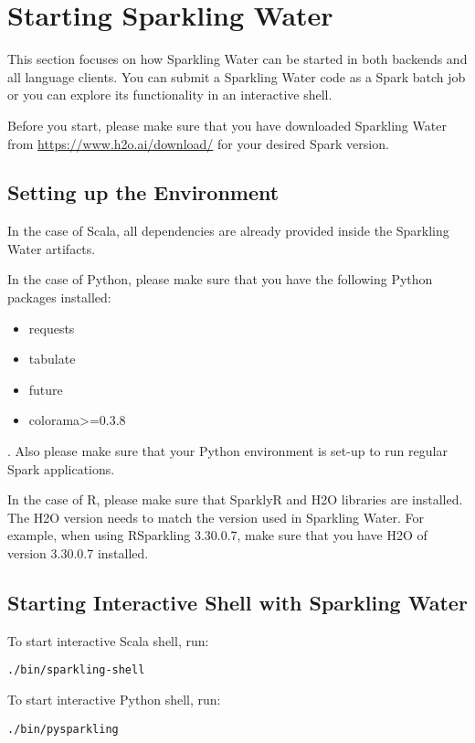 \section{Starting Sparkling Water}

This section focuses on how Sparkling Water can be started in both backends and all language clients.
You can submit a Sparkling Water code as a Spark batch job or you can explore its functionality in an interactive shell.

Before you start, please make sure that you have downloaded Sparkling Water from \url{https://www.h2o.ai/download/} for
your desired Spark version.

\subsection{Setting up the Environment}

In the case of Scala, all dependencies are already provided inside the Sparkling Water artifacts.

In the case of Python, please make sure that you have the following Python packages installed:
\begin{itemize}
    \item requests
    \item tabulate
    \item future
    \item colorama\textgreater=0.3.8
\end{itemize}.
Also please make sure that your Python environment is set-up to run regular Spark applications.

In the case of R, please make sure that SparklyR and H2O libraries are installed. The H2O version needs to match the version
used in Sparkling Water. For example, when using RSparkling 3.30.0.7, make sure that you have H2O of version 3.30.0.7 installed.

\subsection{Starting Interactive Shell with Sparkling Water}

To start interactive Scala shell, run:

\begin{lstlisting}[style=bash]
./bin/sparkling-shell
\end{lstlisting}

To start interactive Python shell, run:

\begin{lstlisting}[style=bash]
./bin/pysparkling
\end{lstlisting}

